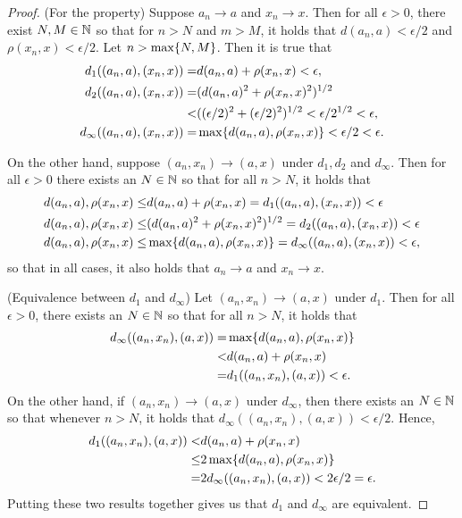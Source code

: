 \begin{proof}
(For the property) Suppose $a_n\to a$ and $x_n\to x$. Then for all $\epsilon>0$, there exist $N,M\in\mathbb{N}$ so that for $n>N$ and $m>M$, it holds that $d(a_n,a)<\epsilon/2$ and $\rho(x_n,x)<\epsilon/2$. Let $n>\max\{N,M\}$. Then it is true that 
\begin{align*}
    d_1((a_n,a),(x_n,x)) =& d(a_n,a)+\rho(x_n,x) <\epsilon,\\
    d_2((a_n,a),(x_n,x)) =& (d(a_n,a)^2+\rho(x_n,x)^2)^{1/2}\\
    <& ((\epsilon/2)^2+(\epsilon/2)^2)^{1/2} <\epsilon/2^{1/2}<\epsilon,\\
    d_\infty((a_n,a),(x_n,x)) =&\max\{d(a_n,a), \rho(x_n,x)\} <\epsilon/2<\epsilon.
\end{align*}

On the other hand, suppose $(a_n,x_n)\to (a,x)$ under $d_1,d_2$ and $d_\infty$. Then for all $\epsilon>0$ there exists an $N\in\mathbb{N}$ so that for all $n>N$, it holds that
\begin{align*}
    d(a_n,a),\rho(x_n,x)
    \leq& d(a_n,a)+\rho(x_n,x) =d_1((a_n,a),(x_n,x)) <\epsilon\\
    d(a_n,a),\rho(x_n,x)
    \leq& (d(a_n,a)^2+\rho(x_n,x)^2)^{1/2} =d_2((a_n,a),(x_n,x)) <\epsilon\\
    d(a_n,a),\rho(x_n,x)
    \leq& \max\{d(a_n,a), \rho(x_n,x)\} =d_\infty((a_n,a),(x_n,x)) <\epsilon,
\end{align*}
so that in all cases, it also holds that $a_n\to a$ and $x_n\to x$.

(Equivalence between $d_1$ and $d_\infty$) Let $(a_n,x_n)\to (a,x)$ under $d_1$. Then for all $\epsilon>0$, there exists an $N\in\mathbb{N}$ so that for all $n>N$, it holds that 
\begin{align*}
    d_\infty((a_n,x_n),(a,x)) 
    =& \max\{d(a_n,a),\rho(x_n,x)\}\\
    <& d(a_n,a)+\rho(x_n,x)\\
    =& d_1((a_n,x_n),(a,x)) <\epsilon.
\end{align*}
On the other hand, if $(a_n,x_n)\to (a,x)$ under $d_\infty$, then there exists an $N\in\mathbb{N}$ so that whenever $n>N$, it holds that $d_\infty((a_n,x_n),(a,x)) <\epsilon/2$. Hence,
\begin{align*}
    d_1((a_n,x_n),(a,x)) 
    <& d(a_n,a)+\rho(x_n,x)\\
    \leq& 2\max\{d(a_n,a),\rho(x_n,x)\}\\
    =& 2d_\infty((a_n,x_n),(a,x)) <2\epsilon/2 = \epsilon.
\end{align*}
Putting these two results together gives us that $d_1$ and $d_\infty$ are equivalent.


\end{proof}
